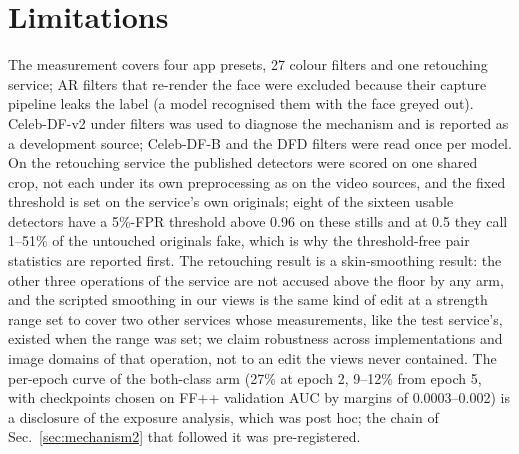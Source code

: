 
\section{Limitations}
The measurement covers four app presets, 27 colour filters and one retouching service; AR filters that re-render the
face were excluded because their capture pipeline leaks the label (a model recognised them with the face greyed out).
Celeb-DF-v2 under filters was used to diagnose the mechanism and is reported as a development source; Celeb-DF-B and
the DFD filters were read once per model. On the retouching service the published detectors were scored on one shared
crop, not each under its own preprocessing as on the video sources, and the fixed threshold is set on the service's
own originals; eight of the sixteen usable detectors have a 5\%-FPR threshold above 0.96 on these stills and at 0.5
they call 1--51\% of the untouched originals fake, which is why the threshold-free pair statistics are reported first. The retouching result
is a skin-smoothing result: the other three operations of the service are not accused above the floor by any arm, and
the scripted smoothing in our views is the same kind of edit at a strength range set to cover two other services
whose measurements, like the test service's, existed when the range was set; we claim robustness across
implementations and image domains of that operation, not to an edit the views never contained. The per-epoch curve of
the both-class arm (27\% at epoch 2, 9--12\% from epoch 5, with checkpoints chosen on FF++ validation AUC by margins of
0.0003--0.002) is a disclosure of the exposure analysis, which was post hoc; the chain of Sec.~\ref{sec:mechanism2}
that followed it was pre-registered.

